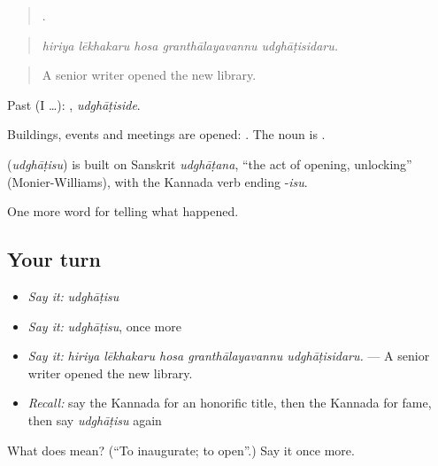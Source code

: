 \begin{quote}
    .
\end{quote}

\begin{quote}
\emph{hiriya lēkhakaru hosa granthālayavannu udghāṭisidaru.}
\end{quote}

\begin{quote}
A senior writer opened the new library.
\end{quote}

Past (I …): , \emph{udghāṭiside}.

Buildings, events and meetings are opened:  . The noun is .

\begin{cousinweb}
\textbf{} (\emph{udghāṭisu}) is built on Sanskrit \emph{udghāṭana}, \textquotedblleft{}the act of opening, unlocking\textquotedblright{} (Monier-Williams), with the Kannada verb ending -\emph{isu}.
\end{cousinweb}

\begin{grammarlens}[title={What you've built}]
One more word for telling what happened.
\end{grammarlens}

\subsection*{Your turn}
\begin{itemize}
\raggedright
  \item \emph{Say it:} \emph{udghāṭisu}
  \item \emph{Say it:} \emph{udghāṭisu}, once more
  \item \emph{Say it:} \emph{hiriya lēkhakaru hosa granthālayavannu udghāṭisidaru.} — A senior writer opened the new library.
  \item \emph{Recall:} say the Kannada for an honorific title, then the Kannada for fame, then say \emph{udghāṭisu} again
\end{itemize}

\begin{tcolorbox}[breakable,colback=teal!4,colframe=teal!35!black,title={Before you move on}]
What does  mean? (\textquotedblleft{}To inaugurate; to open\textquotedblright{}.) Say it once more.
\end{tcolorbox}

